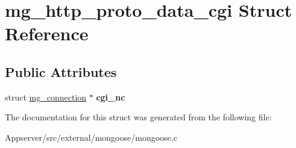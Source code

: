 \hypertarget{structmg__http__proto__data__cgi}{}\section{mg\+\_\+http\+\_\+proto\+\_\+data\+\_\+cgi Struct Reference}
\label{structmg__http__proto__data__cgi}
\subsection*{Public Attributes}
\begin{DoxyCompactItemize}
\item 
struct \hyperlink{structmg__connection}{mg\+\_\+connection} $\ast$ {\bfseries cgi\+\_\+nc}\hypertarget{structmg__http__proto__data__cgi_aeb8534545a10ca2bace6a7868098581b}{}\label{structmg__http__proto__data__cgi_aeb8534545a10ca2bace6a7868098581b}

\end{DoxyCompactItemize}


The documentation for this struct was generated from the following file\+:\begin{DoxyCompactItemize}
\item 
Appserver/src/external/mongoose/mongoose.\+c\end{DoxyCompactItemize}
